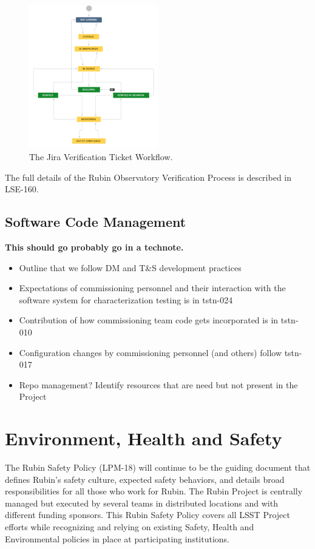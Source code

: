\documentclass[SE,lsstdraft,authoryear,toc]{lsstdoc}
\begin{document}
\begin{figure}[h]
    \centering
    \includegraphics[width=0.5\textwidth]{static/verification_workflow}
    \caption{The Jira Verification Ticket Workflow.}
    \label{fig:verification_workflow}
\end{figure}

The full details of the Rubin Observatory Verification Process is described in LSE-160.

\subsection{Software Code Management}

\textbf{This should go probably go in a technote.}
\begin{itemize}
    \item Outline that we follow DM and T\&S development practices
    \item Expectations of commissioning personnel and their interaction with the software system for characterization testing is in tstn-024
    \item Contribution of how commissioning team code gets incorporated is in tstn-010
    \item Configuration changes by commissioning personnel (and others) follow tstn-017
    \item Repo management?  Identify resources that are need but not present in the Project
\end{itemize}

\section{Environment, Health and Safety}

The Rubin Safety Policy (LPM-18) will continue to be the guiding document that defines Rubin’s safety culture, expected safety behaviors, and details broad responsibilities for all those who work for Rubin.
The Rubin Project is centrally managed but executed by several teams in distributed locations and with different funding sponsors.
This Rubin Safety Policy covers all LSST Project efforts while recognizing and relying on existing Safety,
Health and Environmental policies in place at participating institutions.
\end{document}
